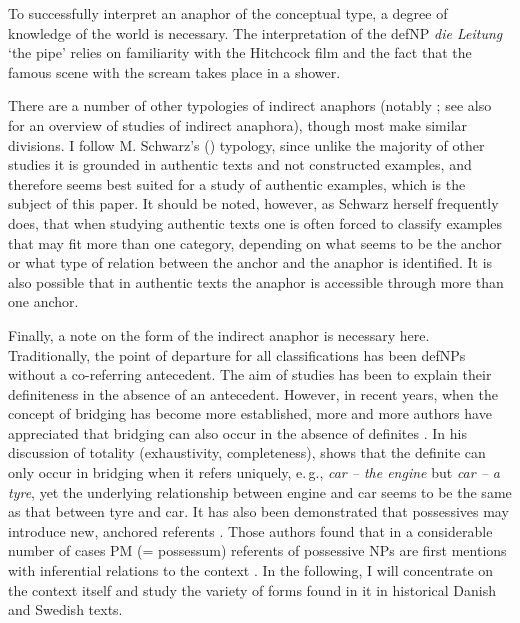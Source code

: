 \documentclass[output=paper]{langsci/langscibook}
\begin{document}
To successfully interpret an anaphor of the conceptual type, a degree of knowledge of the world is necessary. The interpretation of the defNP {\emph{die Leitung}} `the pipe' relies on familiarity with the Hitchcock film and the fact that the famous scene with the scream takes place in a shower. 

There are a number of other typologies of indirect anaphors (notably \citealt{irmer:11}; see also \citealt{zhao:14} for an overview of studies of indirect anaphora), though most make similar divisions. I follow M. Schwarz's (\citeyear{schwarz:00}) typology, since unlike the majority of other studies it is grounded in authentic texts and not constructed examples, and therefore seems best suited for a study of authentic examples, which is the subject of this paper. It should be noted, however, as Schwarz herself frequently does, that when studying authentic texts one is often forced to classify examples that may fit more than one category, depending on what seems to be the anchor or what type of relation between the anchor and the anaphor is identified. It is also possible that in authentic texts the anaphor is accessible through more than one anchor.

Finally, a note on the form of the indirect anaphor is necessary here. Traditionally, the point of departure for all classifications has been defNPs without a co-referring antecedent. The aim of studies has been to explain their definiteness in the absence of an antecedent. However, in recent years, when the concept of bridging has become more established, more and more authors have appreciated that bridging can also occur in the absence of definites \citep[][107]{asher:lascarides:98}. In his discussion of totality (exhaustivity, completeness), \cite{hawkins:78} shows that the definite can only occur in bridging when it refers uniquely, e.\,g., {\emph{car -- the engine}} but {\emph{car -- a tyre}}, yet the underlying relationship between engine and car seems to be the same as that between tyre and car. It has also been demonstrated that possessives may introduce new, anchored referents \citep{willemse:etal:09}. Those authors found that in a considerable number of cases PM (= possessum) referents of possessive NPs are first mentions with inferential relations to the context \citep[][24]{willemse:etal:09}. In the following, I will concentrate on the context itself and study the variety of forms found in it in historical Danish and Swedish texts. 
\end{document}
